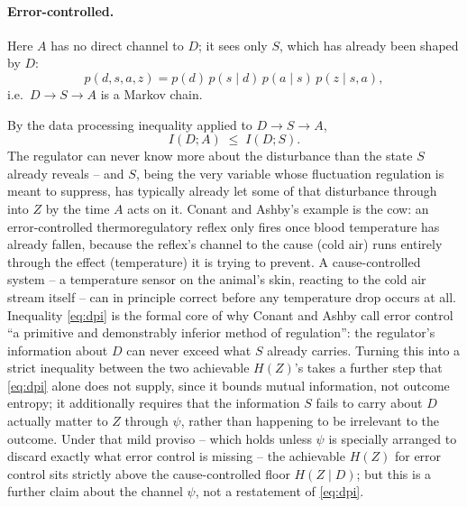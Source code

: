 \documentclass[11pt]{article}
\theoremstyle{definition}
\theoremstyle{remark}
\begin{document}
\paragraph{Error-controlled.} Here $A$ has no direct channel to $D$; it
sees only $S$, which has already been shaped by $D$:
\[
p(d,s,a,z) = p(d)\,p(s\mid d)\,p(a\mid s)\,p(z\mid s,a),
\]
i.e.\ $D\to S\to A$ is a Markov chain.

\begin{center}
\end{center}

By the data processing inequality applied to $D\to S\to A$,
\begin{equation}
I(D;A) \;\le\; I(D;S).
\label{eq:dpi}
\end{equation}
The regulator can never know more about the disturbance than the state $S$
already reveals -- and $S$, being the very variable whose fluctuation
regulation is meant to suppress, has typically already let some of that
disturbance through into $Z$ by the time $A$ acts on it. Conant and
Ashby's example is the cow: an error-controlled thermoregulatory reflex
only fires once blood temperature has already fallen, because the
reflex's channel to the cause (cold air) runs entirely through the effect
(temperature) it is trying to prevent. A cause-controlled system -- a
temperature sensor on the animal's skin, reacting to the cold air stream
itself -- can in principle correct before any temperature drop occurs at
all. Inequality \eqref{eq:dpi} is the formal core of why Conant and Ashby
call error control ``a primitive and demonstrably inferior method of
regulation'': the regulator's information about $D$ can never exceed what
$S$ already carries. Turning this into a strict inequality between the two
achievable $H(Z)$'s takes a further step that \eqref{eq:dpi} alone does
not supply, since it bounds mutual information, not outcome entropy; it
additionally requires that the information $S$ fails to carry about $D$
actually matter to $Z$ through $\psi$, rather than happening to be
irrelevant to the outcome. Under that mild proviso -- which holds unless
$\psi$ is specially arranged to discard exactly what error control is
missing -- the achievable $H(Z)$ for error control sits strictly above the
cause-controlled floor $H(Z\mid D)$; but this is a further claim about the
channel $\psi$, not a restatement of \eqref{eq:dpi}.
\end{document}
